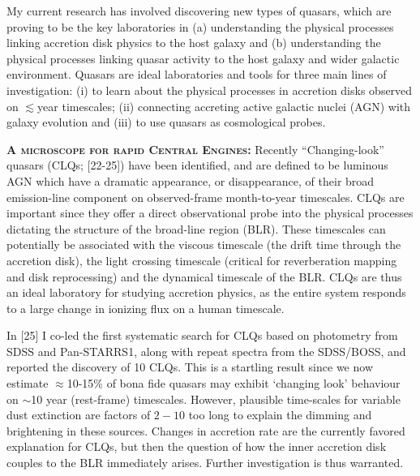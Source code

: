 \smallskip
\smallskip
\noindent
My current research has involved discovering new types of quasars,
which are proving to be the key laboratories in (a) understanding the
physical processes linking accretion disk physics to the host galaxy
and (b) understanding the physical processes linking quasar activity
to the host galaxy and wider galactic environment.  Quasars are ideal
laboratories and tools for three main lines of investigation: {\rm
(i)} to learn about the physical processes in accretion disks observed
on $\lesssim$year timescales; {\rm (ii)} connecting accreting active
galactic nuclei (AGN) with galaxy evolution and {\rm (iii)} to use
quasars as cosmological probes.

\smallskip
\smallskip
\noindent
\textbf{\textsc{A microscope for rapid Central Engines:}}
Recently ``Changing-look'' quasars (CLQs; [22-25]) have been
identified, and are defined to be luminous AGN which have a dramatic
appearance, or disappearance, of their broad emission-line component
on observed-frame month-to-year timescales.  CLQs are important since
they offer a direct observational probe into the physical processes
dictating the structure of the broad-line region (BLR). These
timescales can potentially be associated with the viscous timescale
(the drift time through the accretion disk), the light crossing
timescale (critical for reverberation mapping and disk reprocessing)
and the dynamical timescale of the BLR.  CLQs are thus an ideal
laboratory for studying accretion physics, as the entire system
responds to a large change in ionizing flux on a human timescale.

\smallskip \smallskip
\noindent 
In [25] I co-led the first systematic search for CLQs based on
photometry from SDSS and Pan-STARRS1, along with repeat spectra from
the SDSS/BOSS, and reported the discovery of 10 CLQs. This is a
startling result since we now estimate $\approx$10-15\% of bona fide
quasars may exhibit `changing look' behaviour on $\sim$10 year 
(rest-frame) timescales. However, plausible time-scales for variable
dust extinction are factors of $2-10$ too long to explain the dimming
and brightening in these sources.  Changes in accretion rate are the
currently favored explanation for CLQs, but then the question of how
the inner accretion disk couples to the BLR immediately
arises. Further investigation is thus warranted.

